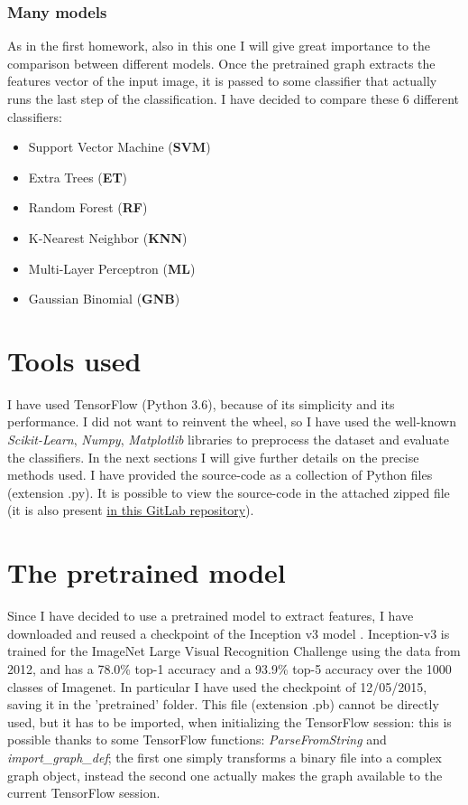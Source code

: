 \documentclass[12pt]{article}
\begin{document}
\subsubsection{Many models}
\label{sec:models}
As in the first homework, also in this one I will give great importance to the comparison between different models. Once the pretrained graph extracts the features vector of the input image, it is passed to some classifier that actually runs the last step of the classification. I have decided to compare these 6 different classifiers:
\begin{itemize}
	\item Support Vector Machine (\textbf{SVM})
	\item Extra Trees (\textbf{ET})
	\item Random Forest (\textbf{RF})
	\item K-Nearest Neighbor (\textbf{KNN})
	\item Multi-Layer Perceptron (\textbf{ML})
	\item Gaussian Binomial (\textbf{GNB})
\end{itemize}

\section{Tools used}
I have used TensorFlow (Python 3.6), because of its simplicity and its performance. I did not want to reinvent the wheel, so I have used the well-known \textit{Scikit-Learn}, \textit{Numpy}, \textit{Matplotlib} libraries to preprocess the dataset and evaluate the classifiers. In the next sections I will give further details on the precise methods used.
I have provided the source-code as a collection of Python files (extension .py). It is possible to view the source-code in the attached zipped file (it is also present \href{https://www.gitlab.com/lrusso96/machine-learning}{in this GitLab repository}).

\section{The pretrained model}
Since I have decided to use a pretrained model to extract features, I have downloaded and reused a checkpoint of the Inception v3 model \cite{Inception}. Inception-v3 is trained for the ImageNet Large Visual Recognition Challenge using the data from 2012, and has a 78.0\% top-1 accuracy and a 93.9\% top-5 accuracy over the 1000 classes of Imagenet. In particular I have used the checkpoint of 12/05/2015, saving it in the 'pretrained' folder. This file (extension .pb) cannot be directly used, but it has to be imported, when initializing the TensorFlow session: this is possible thanks to some TensorFlow functions: \textit{ParseFromString} and \textit{import\_graph\_def}; the first one simply transforms a binary file into a complex graph object, instead the second one actually makes the graph available to the current TensorFlow session.
\end{document}
